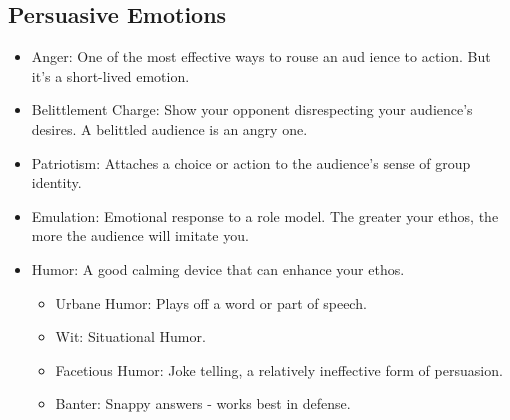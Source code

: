 \subsection{Persuasive Emotions}
\begin{itemize}
	\item Anger: One of the most effective ways to rouse an aud ience to action. But it's a short-lived emotion.
	\item Belittlement Charge: Show your opponent disrespecting your audience's desires. A belittled audience is an angry one.
	\item Patriotism: Attaches a choice or action to the audience's sense of group identity.
	\item Emulation: Emotional response to a role model. The greater your ethos, the more the audience will imitate you.
	\item Humor: A good calming device that can enhance your ethos.
		\begin{itemize}
			\item Urbane Humor: Plays off a word or part of speech.
			\item Wit: Situational Humor.
			\item Facetious Humor: Joke telling, a relatively ineffective form of persuasion.
			\item Banter: Snappy answers - works best in defense.
		\end{itemize}
\end{itemize}

